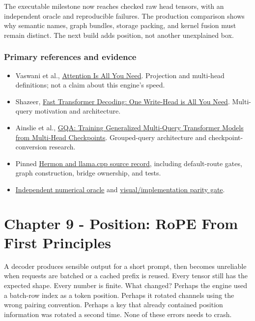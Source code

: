 \documentclass[
  10pt,
]{article}
\providecommand{\tightlist}{%
  \setlength{\itemsep}{0pt}\setlength{\parskip}{0pt}}
\begin{document}
The executable milestone now reaches checked raw head tensors, with an
independent oracle and reproducible failures. The production comparison
shows why semantic names, graph bundles, storage packing, and kernel
fusion must remain distinct. The next build adds position, not another
unexplained box.

\subsubsection{Primary references and
evidence}\label{primary-references-and-evidence}

\begin{itemize}
\tightlist
\item
  Vaswani et al., \href{https://arxiv.org/abs/1706.03762}{Attention Is
  All You Need}. Projection and multi-head definitions; not a claim
  about this engine's speed.
\item
  Shazeer, \href{https://arxiv.org/abs/1911.02150}{Fast Transformer
  Decoding: One Write-Head is All You Need}. Multi-query motivation and
  architecture.
\item
  Ainslie et al., \href{https://arxiv.org/abs/2305.13245}{GQA: Training
  Generalized Multi-Query Transformer Models from Multi-Head
  Checkpoints}. Grouped-query architecture and checkpoint-conversion
  research.
\item
  Pinned
  \href{https://github.com/hermonai/inside-the-llm-engine/blob/astra-visual-rewrite/research/part-02/chapter-08-queries-keys-and-values.md}{Hermon
  and llama.cpp source record}, including default-route gates, graph
  construction, bridge ownership, and tests.
\item
  \href{https://github.com/hermonai/inside-the-llm-engine/blob/astra-visual-rewrite/code/reference/python/chapter08_qkv_oracle.py}{Independent
  numerical oracle} and
  \href{https://github.com/hermonai/inside-the-llm-engine/blob/astra-visual-rewrite/scripts/check-qkv-visual-parity.py}{visual/implementation
  parity gate}.
\end{itemize}

\clearpage

\section{Chapter 9 - Position: RoPE From First
Principles}\label{chapter-9---position-rope-from-first-principles}

A decoder produces sensible output for a short prompt, then becomes
unreliable when requests are batched or a cached prefix is reused. Every
tensor still has the expected shape. Every number is finite. What
changed? Perhaps the engine used a batch-row index as a token position.
Perhaps it rotated channels using the wrong pairing convention. Perhaps
a key that already contained position information was rotated a second
time. None of these errors needs to crash.
\end{document}
